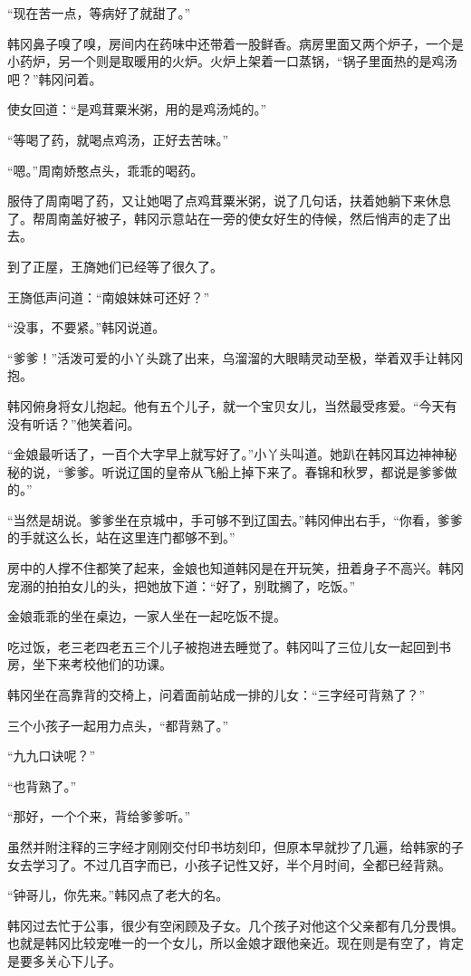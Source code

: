 “现在苦一点，等病好了就甜了。”

韩冈鼻子嗅了嗅，房间内在药味中还带着一股鲜香。病房里面又两个炉子，一个是小药炉，另一个则是取暖用的火炉。火炉上架着一口蒸锅，“锅子里面热的是鸡汤吧？”韩冈问着。

使女回道：“是鸡茸粟米粥，用的是鸡汤炖的。”

“等喝了药，就喝点鸡汤，正好去苦味。”

“嗯。”周南娇憨点头，乖乖的喝药。

服侍了周南喝了药，又让她喝了点鸡茸粟米粥，说了几句话，扶着她躺下来休息了。帮周南盖好被子，韩冈示意站在一旁的使女好生的侍候，然后悄声的走了出去。

到了正屋，王旖她们已经等了很久了。

王旖低声问道：“南娘妹妹可还好？”

“没事，不要紧。”韩冈说道。

“爹爹！”活泼可爱的小丫头跳了出来，乌溜溜的大眼睛灵动至极，举着双手让韩冈抱。

韩冈俯身将女儿抱起。他有五个儿子，就一个宝贝女儿，当然最受疼爱。“今天有没有听话？”他笑着问。

“金娘最听话了，一百个大字早上就写好了。”小丫头叫道。她趴在韩冈耳边神神秘秘的说，“爹爹。听说辽国的皇帝从飞船上掉下来了。春锦和秋罗，都说是爹爹做的。”

“当然是胡说。爹爹坐在京城中，手可够不到辽国去。”韩冈伸出右手，“你看，爹爹的手就这么长，站在这里连门都够不到。”

房中的人撑不住都笑了起来，金娘也知道韩冈是在开玩笑，扭着身子不高兴。韩冈宠溺的拍拍女儿的头，把她放下道：“好了，别耽搁了，吃饭。”

金娘乖乖的坐在桌边，一家人坐在一起吃饭不提。

吃过饭，老三老四老五三个儿子被抱进去睡觉了。韩冈叫了三位儿女一起回到书房，坐下来考校他们的功课。

韩冈坐在高靠背的交椅上，问着面前站成一排的儿女：“三字经可背熟了？”

三个小孩子一起用力点头，“都背熟了。”

“九九口诀呢？”

“也背熟了。”

“那好，一个个来，背给爹爹听。”

虽然并附注释的三字经才刚刚交付印书坊刻印，但原本早就抄了几遍，给韩家的子女去学习了。不过几百字而已，小孩子记性又好，半个月时间，全都已经背熟。

“钟哥儿，你先来。”韩冈点了老大的名。

韩冈过去忙于公事，很少有空闲顾及子女。几个孩子对他这个父亲都有几分畏惧。也就是韩冈比较宠唯一的一个女儿，所以金娘才跟他亲近。现在则是有空了，肯定是要多关心下儿子。

